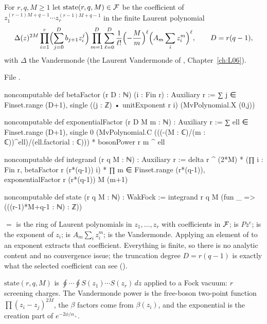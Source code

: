 \begin{definition}\label{l08:def:screen}
For $r,q,M\ge1$ let $\mathrm{state}(r,q,M)\in\mathcal{F}$ be the coefficient of
$z_1^{(r-1)M+q-1}\cdots z_r^{(r-1)M+q-1}$ in the finite Laurent polynomial
\begin{equation*}
\Delta(z)^{2M}\prod_{i=1}^r\Bigl(\sum_{j=0}^{D}b_{j+1}z_i^j\Bigr)\prod_{m=1}^{D}\sum_{\ell=0}^{D}
\frac{1}{\ell!}\Bigl(-\frac Mm\Bigr)^\ell\Bigl(A_m\sum_iz_i^m\Bigr)^\ell,\qquad D = r(q-1),
\end{equation*}
with $\Delta$ the Vandermonde (the Laurent Vandermonde of , Chapter~\ref{ch:L06}).
\end{definition}

\noindent File .
\begin{leancode}
noncomputable def betaFactor (r D : ℕ) (i : Fin r) : Auxiliary r :=
  ∑ j ∈ Finset.range (D+1),
    single ((j : ℤ) • unitExponent r i) (MvPolynomial.X (0,j))

noncomputable def exponentialFactor (r D M m : ℕ) : Auxiliary r :=
  ∑ ell ∈ Finset.range (D+1),
    single 0 (MvPolynomial.C (((-(M : ℂ)/(m : ℂ))^ell)/(ell.factorial : ℂ))) *
      bosonPower r m ^ ell

noncomputable def integrand (r q M : ℕ) : Auxiliary r :=
  delta r ^ (2*M) * (∏ i : Fin r, betaFactor r (r*(q-1)) i) *
    ∏ m ∈ Finset.range (r*(q-1)), exponentialFactor r (r*(q-1)) M (m+1)

noncomputable def state (r q M : ℕ) : WakFock :=
  integrand r q M (fun _ => (((r-1)*M+q-1 : ℕ) : ℤ))
\end{leancode}

\begin{dictionary}
 $=$  is the ring of Laurent polynomials in
$z_1,\ldots,z_r$ with coefficients in $\mathcal{F}$;  is $Pz^e$;  is the
exponent of $z_i$;  is $A_m\sum_iz_i^m$;  is the Vandermonde. Applying an
element of  to an exponent extracts that coefficient. Everything is finite, so there is
no analytic content and no convergence issue; the truncation degree $D=r(q-1)$ is exactly what the
selected coefficient can see ().
\end{dictionary}

\begin{physics}
$\mathrm{state}(r,q,M)$ is $\oint\cdots\oint S(z_1)\cdots S(z_r)\,dz$ applied to a Fock vacuum: $r$ screening
charges. The Vandermonde power is the free-boson two-point function $\prod(z_i-z_j)^{2M}$, the $\beta$
factors come from $\beta(z_i)$, and the exponential is the creation part of $e^{-2\phi/\alpha_+}$.
\end{physics}


